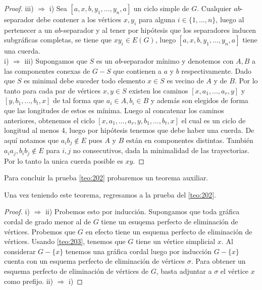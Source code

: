 \begin{proof}
    iii) $\Rightarrow$ i)
    Sea $[a,x,b, y_1, \dots, y_n, a]$ un ciclo simple de $G$. Cualquier $ab$-separador debe contener a los vértices $x,y_i$ para alguna $i\in \{1, \dots, n \}$, luego al pertenecer a un $ab$-separador y al tener por hipótesis que los separadores inducen subgráficas completas, se tiene que $xy_i \in E(G)$, luego $[a,x,b, y_1, \dots, y_n, a]$ tiene una cuerda.\\
    
    i) $\Rightarrow$ iii) 
    Supongamos que $S$ es un $ab$-separador mínimo y denotemos con $A,B$ a las componentes conexas de $G-S$ que contienen a $a$ y $b$ respectivamente. Dado que $S$ es minimal debe suceder todo elemento $x\in S$ es vecino de $A$ y de $B$. Por lo tanto para cada par de vértices $x,y\in S$ existen los caminos $[x,a_1, \dots, a_r,y]$ y $[y,b_1,\dots, b_t,x]$ de tal forma que $a_i\in A, b_i\in B$ y además son elegidos de forma que las longitudes de estos es mínima. Luego al concatenar los caminos anteriores, obtenemos el ciclo $[x,a_1, \dots, a_r,y,b_1,\dots, b_t,x]$ el cual es un ciclo de longitud al menos 4, luego por hipótesis tenemos que debe haber una cuerda. De aquí notamos que $a_ib_j\notin E$ pues $A$ y $B$ están en componentes distintas. También $a_ia_j, b_ib_j \notin E$ para $i,j$ no consecutivos, dada la minimalidad de las trayectorias. Por lo tanto la unica cuerda posible es $xy$.
    
\end{proof}

Para concluir la prueba \cref{teo:202} probaremos un teorema auxiliar.



Una vez teniendo este teorema, regresamos a la prueba del \cref{teo:202}. 
\begin{proof}
    i) $\Rightarrow$ ii) 
    Probemos esto por inducción. Supongamos que toda gráfica cordal de grado menor al de $G$ tiene un esuqema perfecto de eliminación de vértices. Probemos que $G$ en efecto tiene un esquema perfecto de eliminación de vértices. Usando \cref{teo:203}, tenemos que $G$ tiene un vértice simplicial $x$. Al considerar $G-\{x\}$ tenemos una gráfica cordal luego por inducción $G-\{x\}$ cuenta con un esquema perfecto de eliminación de vértices $\sigma $. Para obtener un esquema perfecto de eliminación de vértices de $G$, basta adjuntar a $\sigma$ el vértice $x$ como prefijo.
    ii) $\Rightarrow$ i) 
    
\end{proof}

